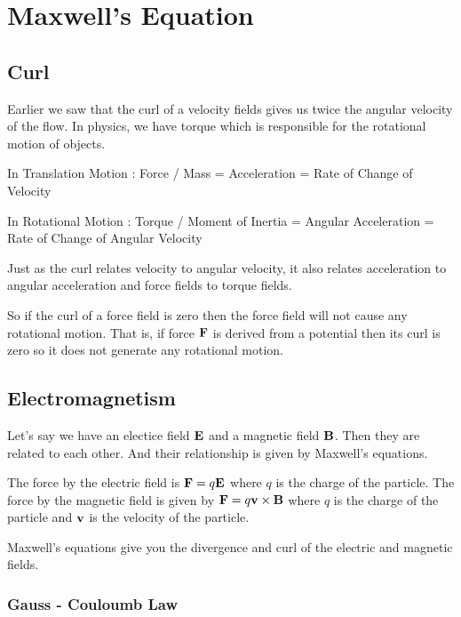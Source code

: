 

\chapter{Maxwell's Equation}

\bigbreak

\section{Curl}

Earlier we saw that the curl of a velocity fields gives us twice the angular velocity of the flow.
In physics, we have torque which is responsible for the rotational motion of objects.

In Translation Motion : Force / Mass = Acceleration = Rate of Change of Velocity

In Rotational Motion : Torque / Moment of Inertia = Angular Acceleration  = Rate of Change of Angular Velocity

Just as the curl relates velocity to angular velocity, it also relates acceleration to angular acceleration
and force fields to torque fields.

So if the curl of a force field is zero then the force field will not cause any rotational motion.
That is, if force ${\bf F}$ is derived from a potential then its curl is zero 
so it does not generate any rotational motion.

\section{Electromagnetism} 

Let's say we have an electice field ${\bf E}$ and a magnetic field ${\bf B}$.
Then they are related to each other. And their relationship is given by Maxwell's equations.

The force by the electric field is ${\bf F} = q {\bf E}$ where $q$ is the charge of the particle.
The force by the magnetic field is given by ${\bf F} = q {\bf v} \times {\bf B}$ where $q$ is the charge of the particle and ${\bf v}$ is the velocity of the particle.
 
Maxwell's equations give you the divergence and curl of the electric and magnetic fields.

\subsection{Gauss - Couloumb Law} 

